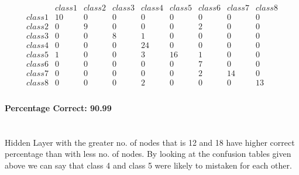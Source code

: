 \documentclass[12pt]{article}
\begin{document}
\[
  \begin{matrix}
  & class1 & class2 & class3 & class4 & class5 & class6 & class7 & class8 \\
class1 &    10 & 0 & 0 & 0 & 0 & 0 & 0 & 0 \\
class2 &    0 & 9 & 0 & 0 & 0 & 2 & 0 & 0 \\
class3 &    0 & 0 & 8 & 1 & 0 & 0 & 0 & 0 \\
class4 &    0 & 0 & 0 & 24 & 0 & 0 & 0 & 0 \\
class5 &    1 & 0 & 0 & 3 & 16 & 1 & 0 & 0 \\
class6 &    0 & 0 & 0 & 0 & 0 & 7 & 0 & 0 \\
class7 &    0 & 0 & 0 & 0 & 0 & 2 & 14 & 0 \\
class8 &    0 & 0 & 0 & 2 & 0 & 0 & 0 & 13 \\
  \end{matrix}
\]
\paragraph*{Percentage Correct: 90.99} 

\section*{}

Hidden Layer with the greater no. of nodes that is 12 and 18 have higher correct percentage than with less no. of nodes.
By looking at the confusion tables given above we can say that class 4 and class 5 were likely to mistaken for each other.
\end{document}
